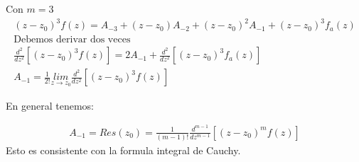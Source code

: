 \documentclass{article}
\newcommand{\caja}[3]{%
  \begin{tcolorbox}[colback=#1!5!white,colframe=#1!25!black,title=#2]
    #3
  \end{tcolorbox}%
}
\begin{document}
Con $ m = 3  $
\begin{gather*}
  (z-z_0) ^ {3 } f(z) = A _{-3 }  + (z-z_0 ) A _{-2 } + (z-z_0 ) ^ {2 } A _{-1 } + (z-z_0) ^ {3 } f_a (z)  \\
  \text{Debemos derivar dos veces }\\
  \frac{d ^ {2 } }{d z ^ {2 }} \left[(z-z_0) ^ {3 } f(z) \right] = 2 A _{-1 } + \frac{d ^ {2 } }{d z ^ {2 }} \left[(z-z_0 )^ {3 } f_a(z) \right]\\
  A _{-1 } = \frac{1}{2! } \underset{z  \rightarrow z_0 }{lim}\frac{d ^ {2 } }{d z ^ {2 }} \left[(z-z_0) ^ {3 } f(z) \right]
\end{gather*}

En general tenemos: 
\caja{red}{}{
  \begin{gather*}
    A _{-1 } = Res(z_0) = \frac{1}{(m-1)! } \frac{d ^ {m-1 } }{d z ^ {m-1 }} \left[(z-z_0) ^ {m }f(z) \right] 
  \end{gather*}
  Esto es consistente con la formula integral de Cauchy.
}
\end{document}
